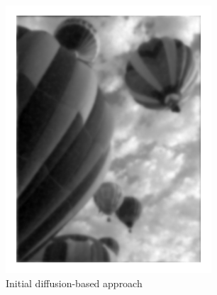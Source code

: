 \begin{figure}
\begin{minipage}[b]{.47\linewidth}
\centering
\includegraphics[width=\textwidth]{figures/balloon_diffusion.pdf}
\caption*{Initial diffusion-based approach}
\end{minipage}
\hspace{0.5cm}
\begin{minipage}[b]{0.47\linewidth}
\centering

\end{minipage}
\end{figure}
